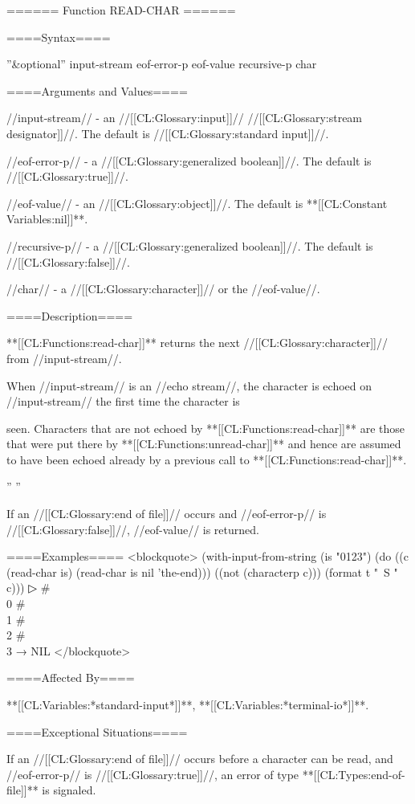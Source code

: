 ====== Function READ-CHAR ======

====Syntax====

 {''&optional'' input-stream eof-error-p eof-value recursive-p} {char}

====Arguments and Values====

//input-stream// - an //[[CL:Glossary:input]]// //[[CL:Glossary:stream designator]]//. The default is //[[CL:Glossary:standard input]]//.

//eof-error-p// - a //[[CL:Glossary:generalized boolean]]//. The default is //[[CL:Glossary:true]]//.

//eof-value// - an //[[CL:Glossary:object]]//. The default is **[[CL:Constant Variables:nil]]**.

//recursive-p// - a //[[CL:Glossary:generalized boolean]]//. The default is //[[CL:Glossary:false]]//.

//char// - a //[[CL:Glossary:character]]// or the //eof-value//.

====Description====

**[[CL:Functions:read-char]]** returns the next //[[CL:Glossary:character]]// from //input-stream//.

When //input-stream// is an //echo stream//, the character is echoed on //input-stream// the first time the character is

seen. Characters that are not echoed by **[[CL:Functions:read-char]]** are those that were put there by **[[CL:Functions:unread-char]]** and hence are assumed to have been echoed already by a previous call to **[[CL:Functions:read-char]]**.

{'' ''}{\ExplainRecursiveP}

If an //[[CL:Glossary:end of file]]// occurs and //eof-error-p// is //[[CL:Glossary:false]]//, //eof-value// is returned.

====Examples==== <blockquote> (with-input-from-string (is "0123") (do ((c (read-char is) (read-char is nil 'the-end))) ((not (characterp c))) (format t "~S " c)))
▷ #\\0 #\\1 #\\2 #\\3 → NIL </blockquote>

====Affected By====

**[[CL:Variables:*standard-input*]]**, **[[CL:Variables:*terminal-io*]]**.

====Exceptional Situations====

If an //[[CL:Glossary:end of file]]// occurs before a character can be read, and //eof-error-p// is //[[CL:Glossary:true]]//, an error of type **[[CL:Types:end-of-file]]** is signaled.

